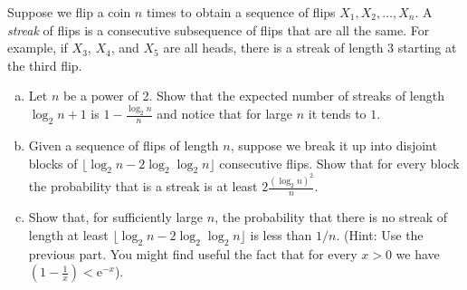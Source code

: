 
Suppose we flip a coin $n$ times to obtain a sequence of flips $X_1,X_2,\ldots,X_n$. A  \emph{streak} of flips is a consecutive subsequence of flips that are all the same. For example, if
$X_3$, $X_4$, and $X_5$ are all heads, there is a streak of length $3$ starting at the third flip.
\begin{enumerate}[(a)]
  \item Let $n$ be a power of 2. Show that the expected number of streaks of
        length $\log_2n+1$ is $1- \frac{\log_2 n}{n}$ and notice that for large $n$ it tends to $1$.



  \item Given a sequence of flips of length $n$, suppose  we break it up into disjoint blocks of $\lfloor \log_2 n-2\log_2\log_2 n \rfloor$  consecutive flips. Show that for every block the probability that is a streak is at least $ 2\frac{(\log_2n)^2}{n}$.



  \item  Show that, for sufficiently large $n$, the probability that there is no
        streak of length at least $\lfloor \log_2 n-2\log_2\log_2 n \rfloor$ is
        less than $1/n$. (Hint: Use the previous part. You might find useful the fact that for every $x > 0$ we have $(1- \frac{1}{x}) < \mathrm{e}^{-x} $).



\end{enumerate}


